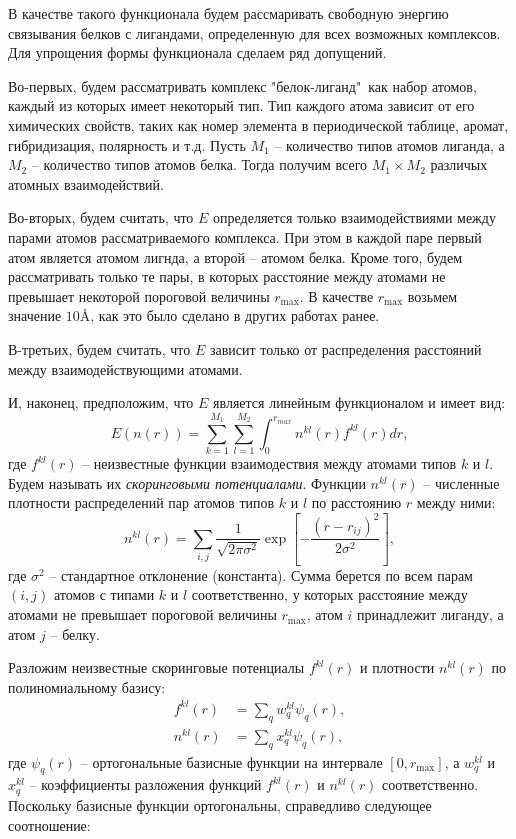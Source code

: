 \documentclass[12pt,twoside]{article}
\begin{document}
В качестве такого функционала будем рассмаривать свободную энергию связывания белков с лигандами, определенную для всех возможных комплексов. Для упрощения формы функционала сделаем ряд допущений.

Во-первых, будем рассматривать комплекс "белок-лиганд"\ как набор атомов, каждый из которых имеет некоторый тип. Тип каждого атома зависит от его химических свойств, таких как номер элемента в периодической таблице, аромат, гибридизация, полярность и т.д. Пусть $M_1$ -- количество типов атомов лиганда, а $M_2$ -- количество типов атомов белка. Тогда получим всего $M_1\times M_2$ различых атомных взаимодействий.

Во-вторых, будем считать, что $E$ определяется только взаимодействиями между парами атомов рассматриваемого комплекса. При этом в каждой паре первый атом является атомом лигнда, а второй -- атомом белка. Кроме того, будем рассматривать только те пары, в которых расстояние между атомами не превышает некоторой пороговой величины $r_{\max}$. В качестве $r_{\max}$ возьмем значение $10$\AA, как это было сделано в других работах \cite{rmax1,rmax2,rmax3,rmax4,rmax5,rmax6} ранее. 

В-третьих, будем считать, что $E$ зависит только от распределения расстояний между взаимодействующими атомами. 

И, наконец, предположим, что $E$ является линейным функционалом и имеет вид: 
\begin{equation}\label{eq2}
E(n(r)) = \sum_{k=1}^{M_1}\sum_{l=1}^{M_2}\int_{0}^{r_{max}}n^{kl}(r)f^{kl}(r)dr,
\end{equation}
где $f^{kl}(r)$ -- неизвестные функции взаимодествия между атомами типов $k$ и $l$. Будем называть их \textit{скоринговыми потенциалами}. Функции $n^{kl}(r)$ -- численные плотности распределений пар атомов типов $k$ и $l$ по расстоянию $r$ между ними: 
\begin{equation}\label{eq3}
n^{kl}(r) = \sum_{i,j} \frac{1}{\sqrt{2\pi\sigma^2}} \exp\left[{-\frac{(r-r_{ij})^2}{2\sigma^2}}\right],
\end{equation}
где $\sigma^2$ -- стандартное отклонение (константа). Сумма берется по всем парам $(i, j)$ атомов с типами $k$ и $l$ соответственно, у которых расстояние между атомами не превышает пороговой величины $r_{\max}$, атом $i$ принадлежит лиганду, а атом $j$ -- белку.

Разложим неизвестные скоринговые потенциалы $f^{kl}(r)$ и плотности $n^{kl}(r)$ по полиномиальному базису: 
\begin{equation}\label{eq4}
\begin{split}
f^{kl}(r) & = \sum_{q} w_q^{kl}\psi_q(r), \\
n^{kl}(r) & = \sum_{q} x_q^{kl}\psi_q(r),
\end{split}
\end{equation}
где $\psi_q(r)$ -- ортогональные базисные функции на интервале $[0, r_{\max}]$, а $w_q^{kl}$ и $x_q^{kl}$ -- коэффициенты разложения функций $f^{kl}(r)$ и $n^{kl}(r)$ соответственно. Поскольку базисные функции ортогональны, справедливо следующее соотношение:
\end{document}
